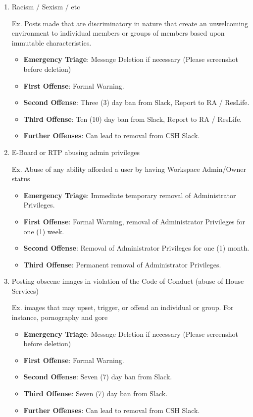 \documentclass{article}
\begin{document}
\begin{enumerate}[I]
\item Racism / Sexism / etc

Ex. Posts made that are discriminatory in nature that create an unwelcoming environment to individual members or groups of members based upon immutable characteristics. 
\begin{itemize}
    \item \textbf{Emergency Triage}: Message Deletion if necessary (Please screenshot before deletion)
    \item \textbf{First Offense}: Formal Warning.
    \item \textbf{Second Offense}: Three (3) day ban from Slack, Report to RA / ResLife.
    \item \textbf{Third Offense}: Ten (10) day ban from Slack, Report to RA / ResLife.
    \item \textbf{Further Offenses}: Can lead to removal from CSH Slack.
\end{itemize}

\item E-Board or RTP abusing admin privileges

Ex. Abuse of any ability afforded a user by having Workspace Admin/Owner status
\begin{itemize}
    \item \textbf{Emergency Triage}: Immediate temporary removal of Administrator Privileges.
    \item \textbf{First Offense}: Formal Warning, removal of Administrator Privileges for one (1) week.
    \item \textbf{Second Offense}: Removal of Administrator Privileges for one (1) month.
    \item \textbf{Third Offense}: Permanent removal of Administrator Privileges.
\end{itemize}

\item Posting obscene images in violation of the Code of Conduct (abuse of House Services)

Ex. images that may upset, trigger, or offend an individual or group. For instance, pornography and gore
\begin{itemize}
    \item \textbf{Emergency Triage}: Message Deletion if necessary (Please screenshot before deletion)
    \item \textbf{First Offense}: Formal Warning.
    \item \textbf{Second Offense}: Seven (7) day ban from Slack.
    \item \textbf{Third Offense}: Seven (7) day ban from Slack.
    \item \textbf{Further Offenses}: Can lead to removal from CSH Slack.
\end{itemize}


\end{enumerate}
\end{document}
